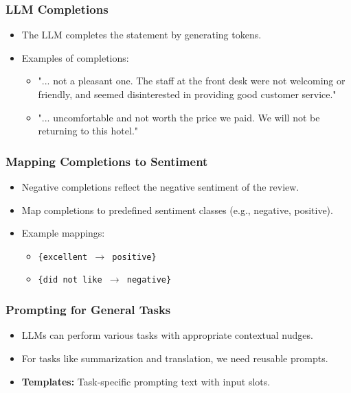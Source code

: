 \documentclass{beamer}
\begin{document}
\begin{frame}
    \frametitle{LLM Completions}
    \begin{itemize}
        \item The LLM completes the statement by generating tokens.
        \item Examples of completions:
        \begin{itemize}
            \item "... not a pleasant one. The staff at the front desk were not welcoming or friendly, and seemed disinterested in providing good customer service."
            \item "... uncomfortable and not worth the price we paid. We will not be returning to this hotel."
        \end{itemize}
    \end{itemize}
\end{frame}

\begin{frame}
    \frametitle{Mapping Completions to Sentiment}
    \begin{itemize}
        \item Negative completions reflect the negative sentiment of the review.
        \item Map completions to predefined sentiment classes (e.g., negative, positive).
        \item Example mappings:
        \begin{itemize}
            \item \texttt{\{excellent $\rightarrow$ positive\}}
            \item \texttt{\{did not like $\rightarrow$ negative\}}
        \end{itemize}
    \end{itemize}
\end{frame}


\begin{frame}
    \frametitle{Prompting for General Tasks}
    \begin{itemize}
        \item LLMs can perform various tasks with appropriate contextual nudges.
        \item For tasks like summarization and translation, we need reusable prompts.
        \item \textbf{Templates:} Task-specific prompting text with input slots.
    \end{itemize}
\end{frame}
\end{document}
